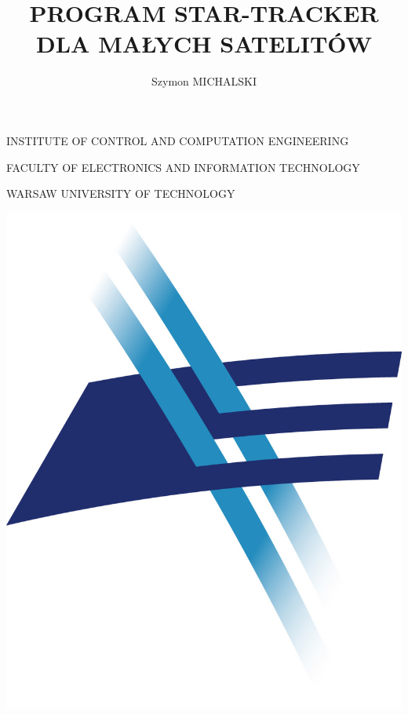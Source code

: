 \documentclass[12pt,a4paper,oneside]{article}
\author{Szymon MICHALSKI}
\title{PROGRAM STAR-TRACKER DLA MAŁYCH SATELITÓW}
\begin{document}

\begin{titlepage}
	\centering

	INSTITUTE OF CONTROL AND COMPUTATION ENGINEERING\par
	FACULTY OF ELECTRONICS AND INFORMATION TECHNOLOGY\par
	WARSAW UNIVERSITY OF TECHNOLOGY\par
	\vspace{0.5cm}
	\includegraphics[scale=0.3]{logo_WEiTI.jpg}
	\hspace{1cm}

\end{titlepage}
\end{document}

